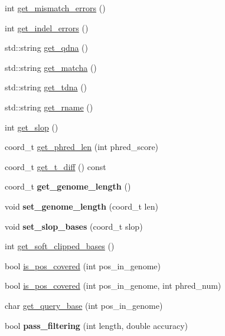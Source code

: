 \begin{DoxyCompactItemize}
\item 
int \hyperlink{class_b_a_m_utils_a4bc4b474bcfd67a0c5f1e6f809368f57}{get\_\-mismatch\_\-errors} ()
\item 
int \hyperlink{class_b_a_m_utils_a42b9fc179dc659139600928f34938831}{get\_\-indel\_\-errors} ()
\item 
std::string \hyperlink{class_b_a_m_utils_ad8cb95bc79f4c69f2fae536d9eb81bc1}{get\_\-qdna} ()
\item 
std::string \hyperlink{class_b_a_m_utils_a4a6c8a6c2e0051dc2502ed0250abdc62}{get\_\-matcha} ()
\item 
std::string \hyperlink{class_b_a_m_utils_a25489eafe1f935f1e89a446ff18807e6}{get\_\-tdna} ()
\item 
std::string \hyperlink{class_b_a_m_utils_aafc0fcde883403393780e3c16e193088}{get\_\-rname} ()
\item 
int \hyperlink{class_b_a_m_utils_af9cf3287bad403dd3584bc66e2716d59}{get\_\-slop} ()
\item 
coord\_\-t \hyperlink{class_b_a_m_utils_a63c57af74b9c49604fe0c25dc15e86cb}{get\_\-phred\_\-len} (int phred\_\-score)
\item 
coord\_\-t \hyperlink{class_b_a_m_utils_a0184af608ab22c40e2563be437cf370a}{get\_\-t\_\-diff} () const 
\item 
\hypertarget{class_b_a_m_utils_aa6e405dab585995b949311f38d084006}{
coord\_\-t {\bfseries get\_\-genome\_\-length} ()}
\label{class_b_a_m_utils_aa6e405dab585995b949311f38d084006}

\item 
\hypertarget{class_b_a_m_utils_aae6d3978e085ae66eea46421d540520c}{
void {\bfseries set\_\-genome\_\-length} (coord\_\-t len)}
\label{class_b_a_m_utils_aae6d3978e085ae66eea46421d540520c}

\item 
\hypertarget{class_b_a_m_utils_a21a57510346bc2c86083962edf9de048}{
void {\bfseries set\_\-slop\_\-bases} (coord\_\-t slop)}
\label{class_b_a_m_utils_a21a57510346bc2c86083962edf9de048}

\item 
int \hyperlink{class_b_a_m_utils_ad524b2e589468b35690a35da92cf8718}{get\_\-soft\_\-clipped\_\-bases} ()
\item 
bool \hyperlink{class_b_a_m_utils_a70a4548a475423dd0145105acffaea31}{is\_\-pos\_\-covered} (int pos\_\-in\_\-genome)
\item 
bool \hyperlink{class_b_a_m_utils_a1eb91072119ca6d53365c275464f78b8}{is\_\-pos\_\-covered} (int pos\_\-in\_\-genome, int phred\_\-num)
\item 
char \hyperlink{class_b_a_m_utils_af6cefb7aaa070d18f540aab758e5439a}{get\_\-query\_\-base} (int pos\_\-in\_\-genome)
\item 
\hypertarget{class_b_a_m_utils_ac25cbf0d2d9767ce5fd1454557c8673c}{
bool {\bfseries pass\_\-filtering} (int length, double accuracy)}
\label{class_b_a_m_utils_ac25cbf0d2d9767ce5fd1454557c8673c}


\end{DoxyCompactItemize}
